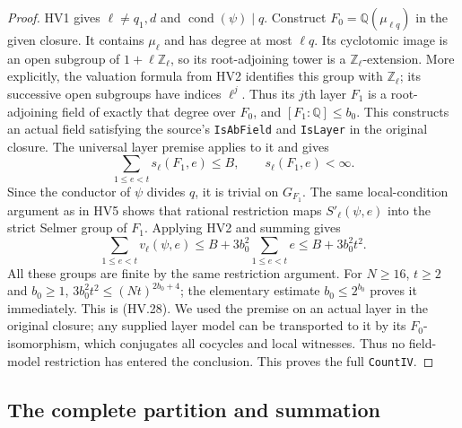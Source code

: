 \begin{proof}
HV1 gives $\ell\ne q_1,d$ and
$\operatorname{cond}(\psi)\mid q$.
Construct $F_0=\mathbb Q(\mu_{\ell q})$ in the given closure.
It contains $\mu_\ell$ and has degree at most $\ell q$.
Its cyclotomic image is an open subgroup of
$1+\ell\mathbb Z_\ell$, so its root-adjoining tower is a
$\mathbb Z_\ell$-extension.  More explicitly, the valuation
formula from HV2 identifies this group with $\mathbb Z_\ell$;
its successive open subgroups have indices $\ell^j$.
Thus its $j$th layer $F_1$ is a root-adjoining field of exactly
that degree over $F_0$, and
$[F_1:\mathbb Q]\le b_0$.
This constructs an actual field satisfying the source's
\texttt{IsAbField} and \texttt{IsLayer} in the original closure.
The universal layer premise applies to it and gives
\[
       \sum_{1\le e<t}s_\ell(F_1,e)\le B,
       \qquad s_\ell(F_1,e)<\infty.
 \tag{HV.29}
\]
Since the conductor of $\psi$ divides $q$, it is trivial on
$G_{F_1}$.  The same local-condition argument as in HV5 shows
that rational restriction maps $S'_\ell(\psi,e)$ into the
strict Selmer group of $F_1$.  Applying HV2 and summing gives
\[
 \sum_{1\le e<t}v_\ell(\psi,e)
 \le B+3b_0^2\sum_{1\le e<t}e
 \le B+3b_0^2t^2.
 \tag{HV.30}
\]
All these groups are finite by the same restriction argument.
For $N\ge16$, $t\ge2$ and $b_0\ge1$,
$3b_0^2t^2\le(Nt)^{2b_0+4}$; the elementary estimate
$b_0\le2^{b_0}$ proves it immediately.  This is (HV.28).
We used the premise on an actual layer in the original closure;
any supplied layer model can be transported to it by its
$F_0$-isomorphism, which conjugates all cocycles and local
witnesses.  Thus no field-model restriction has entered the
conclusion.  This proves the full \texttt{CountIV}.
\end{proof}

\subsection{The complete partition and summation}

